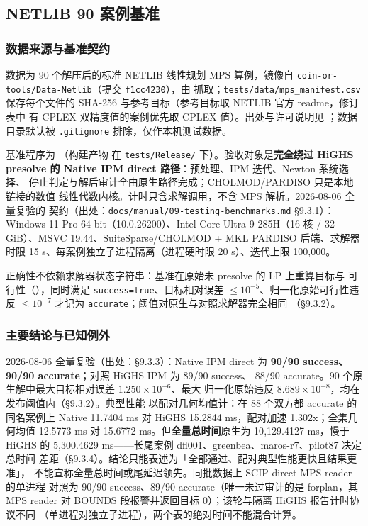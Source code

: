 \subsection{NETLIB 90 案例基准}
\label{sec:engine-nv-netlib}

\subsubsection{数据来源与基准契约}

数据为 90 个解压后的标准 NETLIB 线性规划 MPS 算例，镜像自
\texttt{coin-or-tools/Data-Netlib}（提交 \texttt{f1cc4230}），由
 抓取；\texttt{tests/data/mps\_manifest.csv}
保存每个文件的 SHA-256 与参考目标（参考目标取 NETLIB 官方 readme，修订表中
有 CPLEX 双精度值的案例优先取 CPLEX 值）。出处与许可说明见
；数据目录默认被
\texttt{.gitignore} 排除，仅作本机测试数据。

基准程序为 （构建产物
在 \texttt{tests/Release/} 下）。验收对象是\textbf{完全绕过 HiGHS
presolve 的 Native IPM direct 路径}：预处理、IPM 迭代、Newton 系统选择、
停止判定与解后审计全由原生路径完成；CHOLMOD/PARDISO 只是本地链接的数值
线性代数内核。计时只含求解调用，不含 MPS 解析。2026-08-06 全量复验的
契约（出处：\texttt{docs/manual/09-testing-benchmarks.md} §9.3.1）：
Windows 11 Pro 64-bit（10.0.26200）、Intel Core Ultra 9 285H（16 核 /
32 GiB）、MSVC 19.44、SuiteSparse/CHOLMOD + MKL PARDISO 后端、求解器时限
15 s、每案例独立子进程隔离（进程硬时限 20 s）、迭代上限 100{,}000。

正确性不依赖求解器状态字符串：基准在原始未 presolve 的 LP 上重算目标与
可行性（），同时满足
\texttt{success=true}、目标相对误差 $\le 10^{-5}$、归一化原始可行性违反
$\le 10^{-7}$ 才记为 \texttt{accurate}；阈值对原生与对照求解器完全相同
（§9.3.2）。

\subsubsection{主要结论与已知例外}

2026-08-06 全量复验（出处：§9.3.3）：Native IPM direct 为
\textbf{90/90 success、90/90 accurate}；对照 HiGHS IPM 为 89/90 success、
88/90 accurate。90 个原生解中最大目标相对误差 $1.250\times10^{-6}$、最大
归一化原始违反 $8.689\times10^{-8}$，均在发布阈值内（§9.3.2）。典型性能
以配对几何均值计：在 88 个双方都 accurate 的同名案例上 Native 11.7404 ms
对 HiGHS 15.2844 ms，配对加速 1.302x；全集几何均值 12.5773 ms 对
15.6772 ms。但\textbf{全量总时间}原生为 10{,}129.4127 ms，慢于 HiGHS 的
5{,}300.4629 ms——长尾案例 dfl001、greenbea、maros-r7、pilot87 决定总时间
差距（§9.3.4）。结论只能表述为「全部通过、配对典型性能更快且结果更准」，
不能宣称全量总时间或尾延迟领先。同批数据上 SCIP direct MPS reader 的单进程
对照为 90/90 success、89/90 accurate（唯一未过审计的是 forplan，其 MPS
reader 对 BOUNDS 段报警并返回目标 0）；该轮与隔离 HiGHS 报告计时协议不同
（单进程对独立子进程），两个表的绝对时间不能混合计算。

